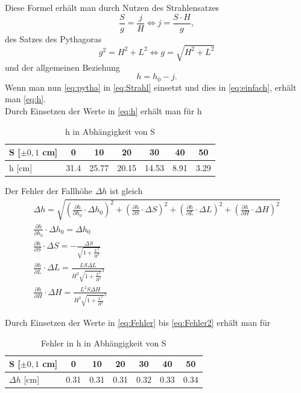Diese Formel erhält man durch Nutzen des Strahlensatzes
\begin{equation}
\frac{S}{g}=\frac{j}{H} \iff j=\frac{S\cdot H}{g},
\label{eq:Strahl}
\end{equation}
des Satzes des Pythagoras
\begin{equation}
g^2=H^2+L^2 \iff g=\sqrt{H^2+L^2}
\label{eq:pytha}
\end{equation}
und der allgemeinen Beziehung
\begin{equation}
h=h_0-j.
\label{eq:einfach}
\end{equation}
Wenn man nun \ref{eq:pytha} in \ref{eq:Strahl} einsetzt und dies in \ref{eq:einfach}, erhält man \ref{eq:h}.
\\

Durch Einsetzen der Werte in \ref{eq:h} erhält man für h
\begin{table}[H]
  \centering
  \begin{tabular}{l | c | c | c | c | c | c}
    S [$\pm 0,1$ cm]  & \num{0} & \num{10} & \num{20} & \num{30} & \num{40} & \num{50}\\ \hline
    h [cm] & \num{31,4} & \num{25,77} & \num{20,15} & \num{14,53} & \num{8,91} & \num{3,29} \\
    
  \end{tabular}
  \caption{h in Abhängigkeit von S}
  \label{tab:hvons}
\end{table}
Der Fehler der Fallhöhe $\Delta h$ ist gleich
\begin{gather}\label{eq:Fehler}
\Delta h= \sqrt{(\frac{\partial h}{\partial h_0}\cdot\Delta h_0)^2+(\frac{\partial h}{\partial S}\cdot\Delta S)^2+(\frac{\partial h}{\partial L}\cdot\Delta L)^2+(\frac{\partial h}{\partial H}\cdot\Delta H)^2}\\
\frac{\partial h}{\partial h_0}\cdot\Delta h_0= \Delta h_0 \\
\frac{\partial h}{\partial S}\cdot\Delta S =-\frac{\Delta S}{\sqrt{1+\frac{L^2}{H^2}}}\\
\frac{\partial h}{\partial L}\cdot\Delta L = \frac{LS\Delta L}{H^2\sqrt{1+\frac{L^2}{H^2}}^3}\\
\label{eq:Fehler2}\frac{\partial h}{\partial H}\cdot\Delta H = \frac{L^2S\Delta H}{H^3\sqrt{1+\frac{L^2}{H^2}}^3}
\end{gather}

Durch Einsetzen der Werte in \ref{eq:Fehler} bis \ref{eq:Fehler2} erhält man für
\begin{table}[H]
  \centering
  \begin{tabular}{l | c | c | c | c | c | c}
    S [$\pm 0,1$ cm]  & \num{0} & \num{10} & \num{20} & \num{30} & \num{40} & \num{50}\\ \hline
  $\Delta h $ [cm] & \num{0,31} & \num{0,31} & \num{0,31} & \num{0,32} & \num{0,33} & \num{0,34} \\
    
  \end{tabular}
  \caption{Fehler in h in Abhängigkeit von S}
  \label{tab:fehlerh}
\end{table}

